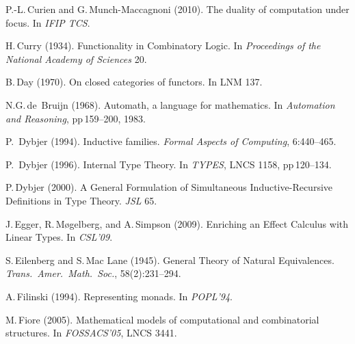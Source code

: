 \documentclass[11pt,twocolumn]{article}
\newcommand{\hide}[1]{}
\begin{document}
{\begin{thebibliography}{000}
P.-L.\,Curien and G.\,Munch-Maccagnoni (2010).
\newblock The duality of computation under focus.
\newblock In \emph{IFIP TCS}.

H.\,Curry (1934).
\newblock Functionality in Combinatory Logic.
\newblock In \emph{Proceedings of the National Academy of Sciences} 20.

B.\,Day (1970).
\newblock On closed categories of functors.
\newblock In LNM 137. 

N.G.\,de~Bruijn (1968).
\newblock Automath, a language for mathematics.
\newblock In \emph{Automation and Reasoning}, pp\,159--200, 1983.

P.~Dybjer (1994).
\newblock Inductive families.
\newblock \emph{Formal Aspects of Computing}, 6:440--465.

P.~Dybjer (1996).
\newblock Internal Type Theory.
\newblock In \emph{TYPES}, LNCS 1158, pp\,120--134.

P.\,Dybjer (2000).
\newblock A General Formulation of Simultaneous Inductive-Recursive
Definitions in Type Theory. 
\newblock \emph{JSL} 65.

J.\,Egger, R.\,M{\o}gelberg, and A.\,Simpson (2009). 
\newblock Enriching an Effect Calculus with Linear Types. 
\newblock In \emph{CSL'09}.

S.\,Eilenberg and S.\,Mac Lane (1945).
\newblock General Theory of Natural Equivalences.
\newblock \emph{Trans.\ Amer.\ Math.\ Soc.},
  58(2):231--294. 

A.\,Filinski (1994).
\newblock Representing monads.
\newblock In \emph{POPL'94}.

\hide{
\bibitem{LiftingKZ}
M.\,Fiore (1995).  
\newblock Lifting as a KZ-doctrine.  
\newblock In \emph{CTCS'96}.
}

\hide{
\bibitem{FiorePPDP}
M.\,Fiore (2002). 
\newblock Semantic analysis of Normalisation By Evaluation for typed
lambda calculus.  
\newblock In \emph{PPDP'02}.
}

M.\,Fiore (2005).  
\newblock Mathematical models of computational and combinatorial
structures.  
\newblock In \emph{FOSSACS'05}, LNCS 3441. 


\end{thebibliography}}
\end{document}
